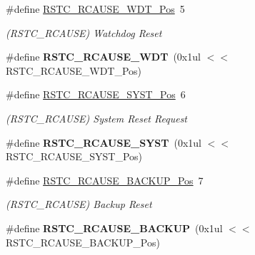 \begin{DoxyCompactItemize}
\item 
\hypertarget{group___s_a_m_l21___r_s_t_c_gafb18fcfc585e399b958ad7033faf0a06}{}\#define \hyperlink{group___s_a_m_l21___r_s_t_c_gafb18fcfc585e399b958ad7033faf0a06}{R\+S\+T\+C\+\_\+\+R\+C\+A\+U\+S\+E\+\_\+\+W\+D\+T\+\_\+\+Pos}~5\label{group___s_a_m_l21___r_s_t_c_gafb18fcfc585e399b958ad7033faf0a06}

\begin{DoxyCompactList}\small\item\em (R\+S\+T\+C\+\_\+\+R\+C\+A\+U\+S\+E) Watchdog Reset \end{DoxyCompactList}\item 
\hypertarget{group___s_a_m_l21___r_s_t_c_gac6378a7bc2bd44ed72fabe25e335b0b0}{}\#define {\bfseries R\+S\+T\+C\+\_\+\+R\+C\+A\+U\+S\+E\+\_\+\+W\+D\+T}~(0x1ul $<$$<$ R\+S\+T\+C\+\_\+\+R\+C\+A\+U\+S\+E\+\_\+\+W\+D\+T\+\_\+\+Pos)\label{group___s_a_m_l21___r_s_t_c_gac6378a7bc2bd44ed72fabe25e335b0b0}

\item 
\hypertarget{group___s_a_m_l21___r_s_t_c_ga852a1a8dfdb9ad73204dd26e72ffbd7e}{}\#define \hyperlink{group___s_a_m_l21___r_s_t_c_ga852a1a8dfdb9ad73204dd26e72ffbd7e}{R\+S\+T\+C\+\_\+\+R\+C\+A\+U\+S\+E\+\_\+\+S\+Y\+S\+T\+\_\+\+Pos}~6\label{group___s_a_m_l21___r_s_t_c_ga852a1a8dfdb9ad73204dd26e72ffbd7e}

\begin{DoxyCompactList}\small\item\em (R\+S\+T\+C\+\_\+\+R\+C\+A\+U\+S\+E) System Reset Request \end{DoxyCompactList}\item 
\hypertarget{group___s_a_m_l21___r_s_t_c_ga18aba6c06db8f2558ad01166ac555401}{}\#define {\bfseries R\+S\+T\+C\+\_\+\+R\+C\+A\+U\+S\+E\+\_\+\+S\+Y\+S\+T}~(0x1ul $<$$<$ R\+S\+T\+C\+\_\+\+R\+C\+A\+U\+S\+E\+\_\+\+S\+Y\+S\+T\+\_\+\+Pos)\label{group___s_a_m_l21___r_s_t_c_ga18aba6c06db8f2558ad01166ac555401}

\item 
\hypertarget{group___s_a_m_l21___r_s_t_c_ga9d922dbc6cfaa6a1ef0263efcc41e536}{}\#define \hyperlink{group___s_a_m_l21___r_s_t_c_ga9d922dbc6cfaa6a1ef0263efcc41e536}{R\+S\+T\+C\+\_\+\+R\+C\+A\+U\+S\+E\+\_\+\+B\+A\+C\+K\+U\+P\+\_\+\+Pos}~7\label{group___s_a_m_l21___r_s_t_c_ga9d922dbc6cfaa6a1ef0263efcc41e536}

\begin{DoxyCompactList}\small\item\em (R\+S\+T\+C\+\_\+\+R\+C\+A\+U\+S\+E) Backup Reset \end{DoxyCompactList}\item 
\hypertarget{group___s_a_m_l21___r_s_t_c_ga6ae7ad917dd6e954299cee2a40375664}{}\#define {\bfseries R\+S\+T\+C\+\_\+\+R\+C\+A\+U\+S\+E\+\_\+\+B\+A\+C\+K\+U\+P}~(0x1ul $<$$<$ R\+S\+T\+C\+\_\+\+R\+C\+A\+U\+S\+E\+\_\+\+B\+A\+C\+K\+U\+P\+\_\+\+Pos)\label{group___s_a_m_l21___r_s_t_c_ga6ae7ad917dd6e954299cee2a40375664}


\end{DoxyCompactItemize}
